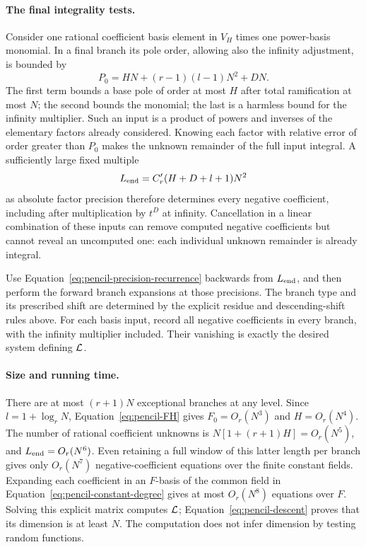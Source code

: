 \paragraph{The final integrality tests.}
Consider one rational coefficient basis element in $V_H$ times one
power-basis monomial.  In a final branch its pole order, allowing also
the infinity adjustment, is bounded by
\begin{equation}\label{eq:pencil-product-pole}
 P_0=HN+(r-1)(l-1)N^2+DN.
\end{equation}
The first term bounds a base pole of order at most $H$ after total
ramification at most $N$; the second bounds the monomial; the last
is a harmless bound for the infinity multiplier.
Such an input is a product of powers and inverses of the elementary
factors already considered.  Knowing each factor with relative error
of order greater than $P_0$ makes the unknown remainder of the full
input integral.  A sufficiently large fixed multiple
\begin{equation}\label{eq:pencil-final-precision}
 L_{\rm end}=C'_r(H+D+l+1)N^2
\end{equation}
as absolute factor precision therefore determines every negative
coefficient, including after multiplication by $t^D$ at infinity.
Cancellation in a linear combination of these inputs can remove
computed negative coefficients but cannot reveal an uncomputed one:
each individual unknown remainder is already integral.

Use Equation~\ref{eq:pencil-precision-recurrence} backwards from
$L_{\rm end}$, and then perform the forward branch expansions at those
precisions.  The branch type and its prescribed shift are determined
by the explicit residue and descending-shift rules above.  For each
basis input, record all negative coefficients in every branch, with
the infinity multiplier included.  Their vanishing is exactly the
desired system defining $\mathcal L$.

\paragraph{Size and running time.}
There are at most $(r+1)N$ exceptional branches at any level.  Since
$l=1+\log_r N$, Equation~\ref{eq:pencil-FH} gives
$F_0=O_r(N^3)$ and $H=O_r(N^4)$.  The number of rational coefficient
unknowns is $N[1+(r+1)H]=O_r(N^5)$, and
$L_{\rm end}=O_r(N^6)$.  Even retaining a full window of this latter
length per branch gives only $O_r(N^7)$ negative-coefficient equations
over the finite constant fields.  Expanding each coefficient in an
$F$-basis of the common field in
Equation~\ref{eq:pencil-constant-degree} gives at most $O_r(N^8)$
equations over $F$.  Solving this explicit matrix computes $\mathcal L$;
Equation~\ref{eq:pencil-descent} proves that its dimension is at least
$N$.  The computation does not infer dimension by testing random
functions.

